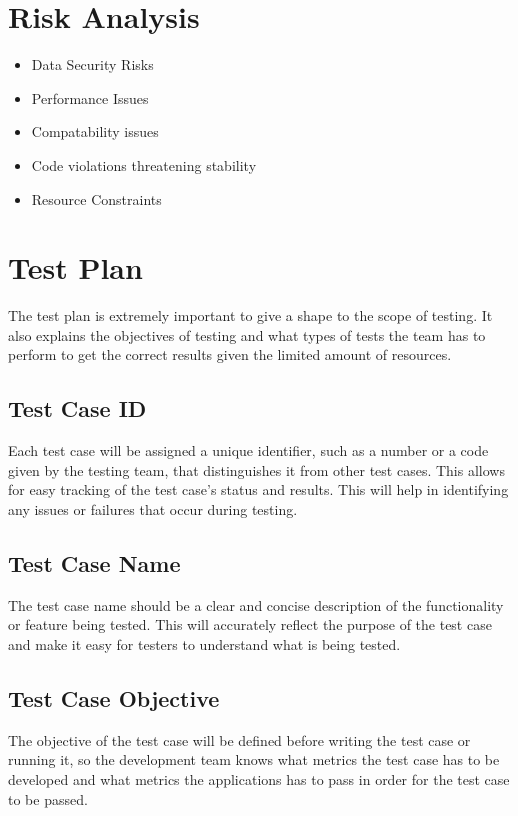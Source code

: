 \documentclass[title page]{article}
\begin{document}
\section{Risk Analysis}
\begin{itemize}
    \item Data Security Risks
    \item Performance Issues 
    \item Compatability issues 
    \item Code violations threatening stability 
    \item Resource Constraints
\end{itemize}

\section{Test Plan}
The test plan is extremely important to give a shape to the scope of testing. It also explains the objectives of testing and what types of tests the team has to perform to get the correct results given the limited amount of resources. 

\subsection{Test Case ID}
Each test case will be assigned a unique identifier, such as a number or a code given by the testing team, that distinguishes it from other test cases. This allows for easy tracking of the test case's status and results. This will help in identifying any issues or failures that occur during testing.

\subsection{Test Case Name}
The test case name should be a clear and concise description of the functionality or feature being tested. This will accurately reflect the purpose of the test case and make it easy for testers to understand what is being tested.

\subsection{Test Case Objective}
The objective of the test case will be defined before writing the test case or running it, so the development team knows what metrics the test case has to be developed and what metrics the applications has to pass in order for the test case to be passed. 
\end{document}
